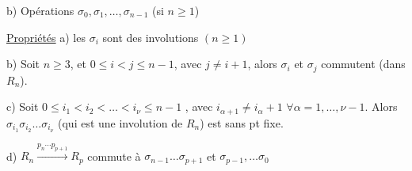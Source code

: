 b) Opérations $\sigma_0,\sigma_1,\ldots,\sigma_{n-1}$ \quad (si $n\ge1$)

\uline{Propriétés} \quad a) les $\sigma_i$ sont des involutions $(n\ge1)$

b) Soit $n\ge3$, et $0\le i<j\le n-1$, avec $j\ne i+1$, alors $\sigma_i$ et $\sigma_j$ commutent  (dans $R_n$).

c) Soit $0\le i_1<i_2<\ldots<i_\nu\le n-1$ , avec $i_{\alpha+1}\ne i_\alpha+1$ $\forall\alpha=1,\ldots,\nu-1$. Alors $\sigma_{i_1}\sigma_{i_2}\ldots\sigma_{i_\nu}$ (qui est une involution de $R_n$) est sans pt fixe.

d) $R_n\xrightarrow{p_n\cdots p_{p+1}}R_p$ commute à $\sigma_{n-1}\ldots\sigma_{p+1}$ et $\sigma_{p-1},\ldots\sigma_0$

